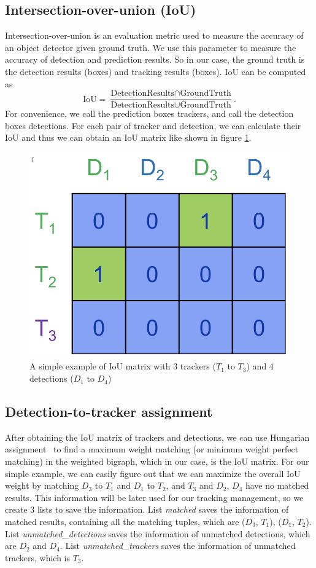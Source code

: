 \documentclass[10pt,twocolumn,letterpaper]{article}
\begin{document}
\subsection{Intersection-over-union (IoU)}
Intersection-over-union is an evaluation metric used to measure the accuracy of an object detector given ground truth. We use this parameter to measure the accuracy of detection and prediction results. So in our case, the ground truth is the detection results (boxes) and tracking results (boxes). IoU can be computed as 
\begin{equation*}
\mbox{IoU} = \frac{\mbox{DetectionResults} \cap \mbox{GroundTruth}}{\mbox{DetectionResults} \cup \mbox{GroundTruth}}.
\end{equation*}
For convenience, we call the prediction boxes trackers, and call the detection boxes detections. For each pair of tracker and detection, we can calculate their IoU and thus we can obtain an IoU matrix like shown in figure \ref{fig:3_1_1}.

\begin{figure}[t]
\begin{center}
   \includegraphics[width=0.4\linewidth]{3_1_1.png}
\end{center}
   \caption{A simple example of IoU matrix with 3 trackers ($T_1$ to $T_3$) and 4 detections ($D_1$ to $D_4$)}
\label{fig:3_1_1}
\end{figure}

\subsection{Detection-to-tracker assignment}
After obtaining the IoU matrix of trackers and detections, we can use Hungarian assignment~\cite{Hungarian1, Hungarian2} to find a maximum weight matching (or minimum weight perfect matching) in the weighted bigraph, which in our case, is the IoU matrix. For our simple example, we can easily figure out that we can maximize the overall IoU weight by matching $D_3$ to $T_1$ and $D_1$ to $T_2$, and $T_3$ and $D_2$, $D_4$ have no matched results. This information will be later used for our tracking management, so we create 3 lists to save the information. List \emph{matched} saves the information of matched results, containing all the matching tuples, which are ($D_3$, $T_1$), ($D_1$, $T_2$). List \emph{unmatched\_detections} saves the information of unmatched detections, which are $D_2$ and $D_4$. List \emph{unmatched\_trackers} saves the information of unmatched trackers, which is $T_3$.
\end{document}
